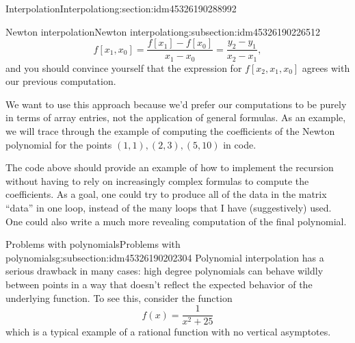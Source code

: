 \documentclass[oneside,10pt,]{article}
\numberwithin{equation}{section}
\numberwithin{equation}{section}
\begin{document}
\begin{sectionptx}{Interpolation}{}{Interpolation}{}{}{g:section:idm45326190288992}
\begin{subsectionptx}{Newton interpolation}{}{Newton interpolation}{}{}{g:subsection:idm45326190226512}
\begin{equation*}
f[x_1, x_0] = \frac{f[x_1] - f[x_0]}{x_1 - x_0} = \frac{y_2 - y_1}{x_2 - x_1},
\end{equation*}
and you should convince yourself that the expression for \(f[x_2, x_1, x_0]\) agrees with our previous computation.%
\par
We want to use this approach because we'd prefer our computations to be purely in terms of array entries, not the application of general formulas. As an example, we will trace through the example of computing the coefficients of the Newton polynomial for the points \((1,1), (2, 3), (5,10)\) in code.%
The code above should provide an example of how to implement the recursion without having to rely on increasingly complex formulas to compute the coefficients. As a goal, one could try to produce all of the data in the matrix ``data'' in one loop, instead of the many loops that I have (suggestively) used. One could also write a much more revealing computation of the final polynomial.%
\end{subsectionptx}
%
%
\typeout{************************************************}
\typeout{************************************************}
%
\begin{subsectionptx}{Problems with polynomials}{}{Problems with polynomials}{}{}{g:subsection:idm45326190202304}
Polynomial interpolation has a serious drawback in many cases: high degree polynomials can behave wildly between points in a way that doesn't reflect the expected behavior of the underlying function. To see this, consider the function%
\begin{equation*}
f(x) = \frac{1}{x^2 + 25}
\end{equation*}
which is a typical example of a rational function with no vertical asymptotes. \begin{sageinput}

\end{sageinput}
\end{subsectionptx}
\end{sectionptx}
\end{document}
